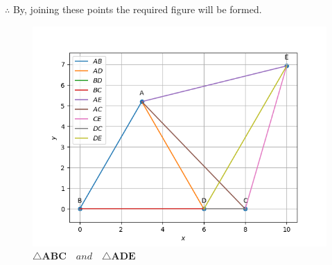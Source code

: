 \documentclass[11pt, a4paper]{article}
\let\vec\mathbf
\begin{document}
\begin{enumerate}
\begin{enumerate}[label=(\roman*)]
$\therefore$ By, joining these points the required figure will be formed.

\end{enumerate}
\begin{figure}[H]
    \includegraphics[width=\columnwidth]{figs/Final_python.png}
	\caption{$\triangle \vec{ABC} \hspace{12pt} and \hspace{12pt} \triangle \vec{ADE}$}
    \label{fig:fig2}
\end{figure}
\end{enumerate}
\end{document}
